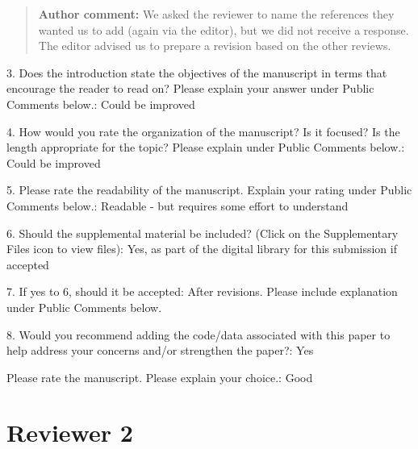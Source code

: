 \documentclass[10pt]{article}
\newcommand{\authorcomment}[1]{\begin{quote}\textbf{Author comment:} #1\end{quote}}
\begin{document}
\authorcomment{We asked the reviewer to name the references they wanted us to add (again via the editor), but we did not receive a response.
The editor advised us to prepare a revision based on the other reviews.}
\begin{spverbatim}
3. Does the introduction state the objectives of the manuscript in terms that encourage the reader to read on? Please explain your answer under Public Comments below.: Could be improved

4. How would you rate the organization of the manuscript? Is it focused? Is the length appropriate for the topic? Please explain under Public Comments below.: Could be improved

5. Please rate the readability of the manuscript. Explain your rating under Public Comments below.: Readable - but requires some effort to understand

6. Should the supplemental material be included? (Click on the Supplementary Files icon to view files): Yes, as part of the digital library for this submission if accepted

7. If yes to 6, should it be accepted: After revisions.  Please include explanation under Public Comments below.

8. Would you recommend adding the code/data associated with this paper to help address your concerns and/or strengthen the paper?: Yes

Please rate the manuscript. Please explain your choice.: Good
\end{spverbatim}


\section{Reviewer 2}
\end{document}
